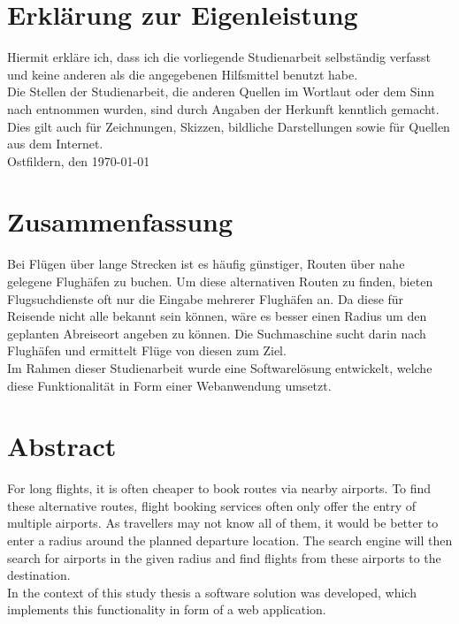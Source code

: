 \documentclass[12pt,twoside,a4paper]{article}
\begin{document}
\section*{Erklärung zur Eigenleistung}
Hiermit erkläre ich, dass ich die vorliegende Studienarbeit selbständig verfasst und keine anderen als die angegebenen Hilfsmittel benutzt habe.\\
Die Stellen der Studienarbeit, die anderen Quellen im Wortlaut oder dem Sinn nach entnommen wurden, sind durch Angaben der Herkunft kenntlich gemacht. Dies gilt auch für Zeichnungen, Skizzen, bildliche Darstellungen sowie für Quellen aus dem Internet.
\vspace{1cm}\\Ostfildern, den \today \hspace{1cm} \hrulefill
\newpage
\begin{sloppypar}
\section*{Zusammenfassung}
Bei Flügen über lange Strecken ist es häufig günstiger, Routen über nahe gelegene Flughäfen zu buchen. Um diese alternativen Routen zu finden, bieten Flugsuchdienste oft nur die Eingabe mehrerer Flughäfen an. Da diese für Reisende nicht alle bekannt sein können, wäre es besser einen Radius um den geplanten Abreiseort angeben zu können. Die Suchmaschine sucht darin nach Flughäfen und ermittelt Flüge von diesen zum Ziel.\\
Im Rahmen dieser Studienarbeit wurde eine Softwarelösung entwickelt, welche diese Funktionalität in Form einer Webanwendung umsetzt.
\section*{Abstract}
For long flights, it is often cheaper to book routes via nearby airports. To find these alternative routes, flight booking services often only offer the entry of multiple airports. As travellers may not know all of them, it would be better to enter a radius around the planned departure location. The search engine will then search for airports in the given radius and find flights from these airports to the destination.\\
In the context of this study thesis a software solution was developed, which implements this functionality in form of a web application.
\newpage
\tableofcontents
\newpage
\listoffigures
\vfill
\printglossary[type=\acronymtype]
\newpage
{}
\setcounter{page}{1}

\end{sloppypar}
\end{document}
